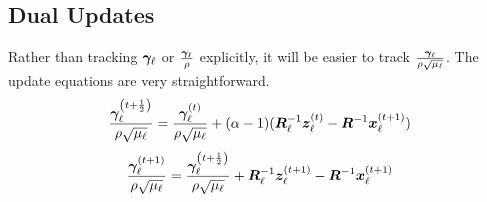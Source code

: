 \subsection{Dual Updates}
Rather than tracking $\bm{\gamma}_{\ell}$ or $\frac{\bm{\gamma}_{\ell}}{\rho}$ explicitly, it will be easier to track $\frac{\bm{\gamma}_{\ell}}{\rho\sqrt{\mu_{\ell}}}$. The update equations are very straightforward.
%
\begin{equation}
\frac{\bm{\gamma}_{\ell}^{\left(t + \frac{1}{2}\right)}}{\rho\sqrt{\mu_{\ell}}} = \frac{\bm{\gamma}_{\ell}^{(t)}}{\rho\sqrt{\mu_{\ell}}} + (\alpha - 1)(\bm{R}_{\ell}^{-1}\bm{z}_{\ell}^{(t)} - \bm{R}^{-1}\bm{x}_{\ell}^{(t + 1)})
\end{equation}
%
\begin{equation}
\frac{\bm{\gamma}_{\ell}^{(t + 1)}}{\rho\sqrt{\mu_{\ell}}} = \frac{\bm{\gamma}_{\ell}^{\left(t + \frac{1}{2}\right)}}{\rho\sqrt{\mu_{\ell}}} + \bm{R}_{\ell}^{-1}\bm{z}_{\ell}^{(t + 1)} - \bm{R}^{-1}\bm{x}_{\ell}^{(t + 1)} 
\end{equation}

